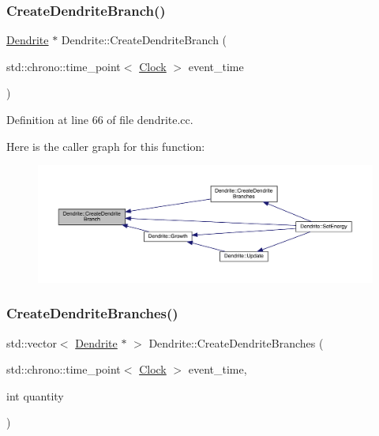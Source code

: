 \subsubsection{\texorpdfstring{Create\+Dendrite\+Branch()}{CreateDendriteBranch()}}
{\footnotesize\ttfamily \hyperlink{class_dendrite}{Dendrite} $\ast$ Dendrite\+::\+Create\+Dendrite\+Branch (\begin{DoxyParamCaption}\item[{std\+::chrono\+::time\+\_\+point$<$ \hyperlink{universe_8h_a0ef8d951d1ca5ab3cfaf7ab4c7a6fd80}{Clock} $>$}]{event\+\_\+time }\end{DoxyParamCaption})}



Definition at line 66 of file dendrite.\+cc.

Here is the caller graph for this function\+:
\nopagebreak
\begin{figure}[H]
\begin{center}
\leavevmode
\includegraphics[width=350pt]{class_dendrite_ac7b30397a4753f9c37e96ed716e275eb_icgraph}
\end{center}
\end{figure}
\mbox{\label{class_dendrite_a812b9cd99ae7d81023bfa25c8f563e96}} 
\subsubsection{\texorpdfstring{Create\+Dendrite\+Branches()}{CreateDendriteBranches()}}
{\footnotesize\ttfamily std\+::vector$<$ \hyperlink{class_dendrite}{Dendrite} $\ast$ $>$ Dendrite\+::\+Create\+Dendrite\+Branches (\begin{DoxyParamCaption}\item[{std\+::chrono\+::time\+\_\+point$<$ \hyperlink{universe_8h_a0ef8d951d1ca5ab3cfaf7ab4c7a6fd80}{Clock} $>$}]{event\+\_\+time,  }\item[{int}]{quantity }\end{DoxyParamCaption})}



